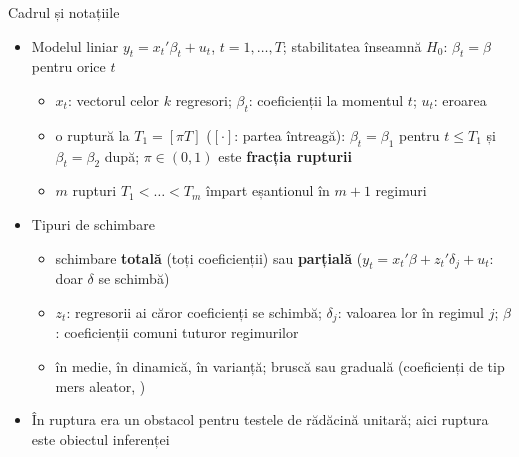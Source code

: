 \begin{frame}{Cadrul și notațiile}
\itemsize{\small}
\begin{itemize}
    \item Modelul liniar $y_t = x_t'\beta_t + u_t$, $t = 1, \dots, T$; stabilitatea înseamnă $H_0$: $\beta_t = \beta$ pentru orice $t$
    \begin{itemize}
        \item $x_t$: vectorul celor $k$ regresori; $\beta_t$: coeficienții la momentul $t$; $u_t$: eroarea
        \item o ruptură la $T_1 = [\pi T]$ ($[\cdot]$: partea întreagă): $\beta_t = \beta_1$ pentru $t \le T_1$ și $\beta_t = \beta_2$ după; $\pi \in (0, 1)$ este \textbf{fracția rupturii}
        \item $m$ rupturi $T_1 < \dots < T_m$ împart eșantionul în $m + 1$ regimuri
    \end{itemize}
    \item Tipuri de schimbare
    \begin{itemize}
        \item schimbare \textbf{totală} (toți coeficienții) sau \textbf{parțială} ($y_t = x_t'\beta + z_t'\delta_j + u_t$: doar $\delta$ se schimbă)
        \item $z_t$: regresorii ai căror coeficienți se schimbă; $\delta_j$: valoarea lor în regimul $j$; $\beta$: coeficienții comuni tuturor regimurilor
        \item în medie, în dinamică, în varianță; bruscă sau graduală (coeficienți de tip mers aleator, )
    \end{itemize}
    \item În  ruptura era un obstacol pentru testele de rădăcină unitară; aici ruptura este obiectul inferenței
\end{itemize}
\end{frame}

